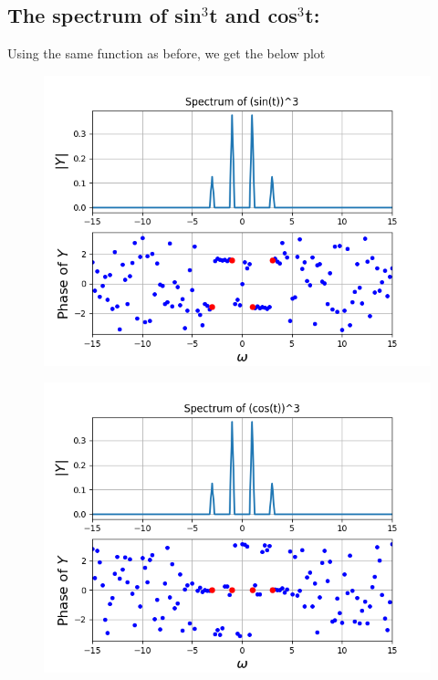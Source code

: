 \documentclass[12pt, a4paper]{report}
\begin{document}
\subsection{The spectrum of sin$^3$t and cos$^3$t:}
Using the same function as before, we get the below plot
\begin{figure}[h!]
    \centering
    \includegraphics[scale=0.7]{fig3.png} 
    \caption{}
    \label{fig:my_label}
\end{figure}
\begin{figure}[h!]
    \centering
    \includegraphics[scale=0.7]{fig4.png} 
    \caption{}
    \label{fig:my_label}
\end{figure}
\vspace{100mm}
\end{document}
